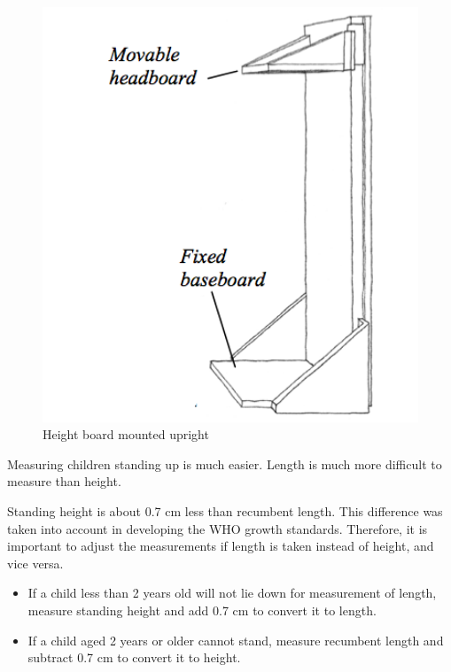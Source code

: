 \documentclass[
  12pt,
]{book}
\begin{document}
\begin{figure}

{\centering \includegraphics[width=5.4in]{images/heightBoard04} 

}

\caption{Height board mounted upright}\label{fig:height05}
\end{figure}

Measuring children standing up is much easier. Length is much more difficult to measure than height.

Standing height is about 0.7 cm less than recumbent length. This difference was taken into account in developing the WHO growth standards. Therefore, it is important to adjust the measurements if length is taken instead of height, and vice versa.

\begin{itemize}
\item
  If a child less than 2 years old will not lie down for measurement of length, measure standing height and add 0.7 cm to convert it to length.
\item
  If a child aged 2 years or older cannot stand, measure recumbent length and subtract 0.7 cm to convert it to height.
\end{itemize}
\end{document}
